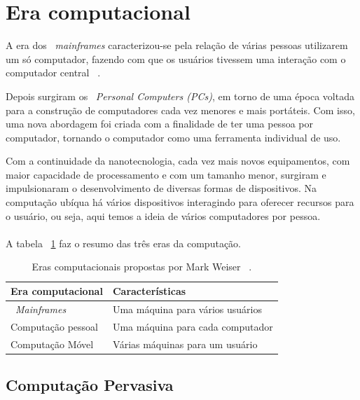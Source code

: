 \section{Era computacional}
\label{sec:ubicomp}

	A era dos ~\textit{mainframes} caracterizou-se pela relação de várias pessoas utilizarem um só
	computador, fazendo com que os usuários tivessem uma interação com o computador central
	~\cite{alegomes, passaro}.
	
	Depois surgiram os ~\textit{Personal Computers (PCs)}, em torno de uma época voltada para a
	construção de computadores cada vez menores e mais portáteis. Com isso, uma nova abordagem foi
	criada com a finalidade de ter uma pessoa por computador, tornando o computador como uma ferramenta
	individual de uso.
	
	Com a continuidade da nanotecnologia, cada vez mais novos equipamentos, com maior capacidade de
	processamento e com um tamanho menor, surgiram e impulsionaram o desenvolvimento de diversas
	formas de dispositivos. Na computação ubíqua há vários dispositivos interagindo para oferecer
	recursos para o usuário, ou seja, aqui temos a ideia de vários computadores por pessoa. \\ \\
	
	A tabela ~\ref{tab:eraComputacional} faz o resumo das três eras da computação.
	
	\begin{table} %
			\centering
			\caption{Eras computacionais propostas por Mark Weiser ~\cite{alegomes}.} %
			\begin{tabular}{l|l} 
				\hline %
				 Era computacional & Características \\
				\hline
				\hline
				~\textit{Mainframes} & Uma máquina para vários usuários \\
				Computação pessoal & Uma máquina para cada computador \\
				Computação Móvel & Várias máquinas para um usuário \\ 
				\hline
			\end{tabular}
			\label{tab:eraComputacional}
		\end{table}
	
	\subsection{Computação Pervasiva}
	
